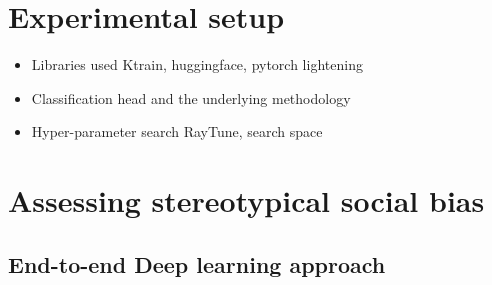 \section{Experimental setup}
\begin{itemize}
    \item Libraries used {Ktrain, huggingface, pytorch lightening}
    \item Classification head and the underlying methodology 
    \item Hyper-parameter search {RayTune}, search space
\end{itemize}
\section{Assessing stereotypical social bias}
\subsection{End-to-end Deep learning approach}
